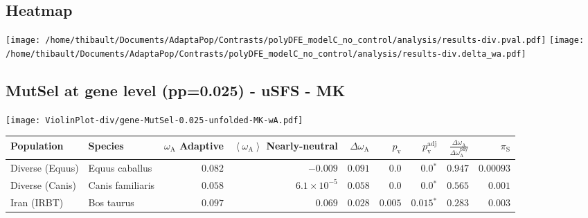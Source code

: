 \subsection{Heatmap} 
\begin{center}
\texttt{[image: /home/thibault/Documents/AdaptaPop/Contrasts/polyDFE\_modelC\_no\_control/analysis/results-div.pval.pdf]} 
\texttt{[image: /home/thibault/Documents/AdaptaPop/Contrasts/polyDFE\_modelC\_no\_control/analysis/results-div.delta\_wa.pdf]} 
\end{center}
\subsection{MutSel at gene level (pp=0.025) - uSFS - MK} 
\begin{center}
\texttt{[image: ViolinPlot-div/gene-MutSel-0.025-unfolded-MK-wA.pdf]} 
\begin{adjustbox}{width = 1\textwidth}
\begin{tabular}{|l|l|r|r|r|r|r|r|r|}
\toprule
                     Population &              Species & \specialcell{$\omega_{\mathrm{A}}$ \\ Adaptive} & \specialcell{$\left< \omega_{\mathrm{A}} \right>$ \\ Nearly-neutral} & $\Delta \omega_{\mathrm{A}} $ & $p_{\mathrm{v}}$ & $p_{\mathrm{v}}^{\mathrm{adj}}$ & $\frac{\Delta\omega_{\mathrm{A}}}{\Delta\omega_{\mathrm{A}}^{\mathrm{phy}}}$ & $\pi_{\textrm{S}}$ \\
\midrule
                Diverse (Equus) &       Equus caballus &                                        $ 0.082$ &                                           $-0.009$ &                      $ 0.091$ &            $0.0$ &                  $\bm{0.0{^*}}$ &                                           $ 0.947$ &          $0.00093$ \\
                Diverse (Canis) &     Canis familiaris &                                        $ 0.058$ &                                $6.1\times 10^{-5}$ &                      $ 0.058$ &            $0.0$ &                  $\bm{0.0{^*}}$ &                                           $ 0.565$ &           $ 0.001$ \\
                    Iran (IRBT) &           Bos taurus &                                        $ 0.097$ &                                           $ 0.069$ &                      $ 0.028$ &         $ 0.005$ &               $\bm{ 0.015{^*}}$ &                                           $ 0.283$ &           $ 0.003$ \\

\end{tabular}
\end{adjustbox}
\end{center}
